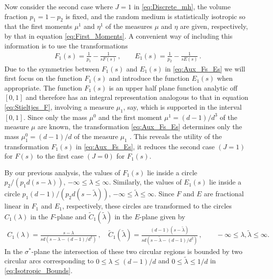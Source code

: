 \documentclass[11pt]{amsart}
\begin{document}
Now consider the second case where $J=1$ in \eqref{eq:Discrete_mh},
the volume fraction $p_1=1-p_2$ is fixed, and the random medium is
statistically isotropic so that the first moments $\mu^1$ and $\eta^1$ of
the measures $\mu$ and $\eta$ are given, respectively, by that in equation  
\eqref{eq:First_Moments}.  A convenient way of including this
information is to use the transformations \cite{Bergman:AP-78}
%
\begin{align}\label{eq:Aux_Fs_Es}
  F_1(s)=\frac{1}{p_1}-\frac{1}{sF(s)}\,, \qquad
  E_1(s)=\frac{1}{p_2}-\frac{1}{sE(s)}\,.
\end{align}
%
Due to the symmetries between $F_1(s)$ and $E_1(s)$ in
\eqref{eq:Aux_Fs_Es} we will first focus on the function $F_1(s)$ and
introduce the function $E_1(s)$ when appropriate. The function
$F_1(s)$ is an upper half plane function analytic off $[0,1]$ and
therefore has an integral representation
\cite{Bergman:AP-78,Golden:1986:BCP} analogous to that in equation
\eqref{eq:Stieltjes_F}, involving a
measure $\mu_1$, say, which is supported in the interval $[0,1]$. Since
only the mass $\mu^0$ and the first moment $\mu^1=(d-1)/d^3$ of the
measure $\mu$ are known, the transformation \eqref{eq:Aux_Fs_Es}
determines only the mass $\mu_1^0=(d-1)/d$ of the measure $\mu_1$
\cite{Bergman:AP-78,Golden:1986:BCP}. This reveals the utility of the
transformation $F_1(s)$ in \eqref{eq:Aux_Fs_Es}, it reduces the second
case $(J=1)$ for $F(s)$ to the first case $(J=0)$ for $F_1(s)$.



By our previous analysis, the values of $F_1(s)$ lie inside a circle
$p_2/(p_1d(s-\lambda))$, $-\infty\leq\lambda\leq\infty$. Similarly, the values of $E_1(s)$ lie
inside a circle $p_1(d-1)/(p_2d(s-\tilde{\lambda}))$,
$-\infty\leq\tilde{\lambda}\leq\infty$. Since $F$ and $E$ are fractional linear in $F_1$ and
$E_1$, respectively, these circles are transformed to the circles
$C_1(\lambda)$ in the $F$-plane and $\tilde{C}_1(\tilde{\lambda})$ in the
$E$-plane given by \cite{Golden:1986:BCP}
%
\begin{align}\label{eq:Isotropic_Bounds}
  C_1(\lambda)=\frac{s-\lambda}{sd(s-\lambda-(d-1)/d^2)}\,, \quad  %
  \tilde{C}_1(\tilde{\lambda})=\frac{(d-1)(s-\tilde{\lambda})}{sd(s-\tilde{\lambda}-(d-1)/d^2)}\,,
   \qquad -\infty\leq\lambda,\tilde{\lambda}\leq\infty. %
\end{align}
%
In the $\sigma^*$-plane the intersection of these two circular regions is
bounded by two circular arcs \cite{Golden:1986:BCP} corresponding to
$0\leq\lambda\leq(d-1)/d$ and $0\leq\tilde{\lambda}\leq1/d$ in \eqref{eq:Isotropic_Bounds}.
\end{document}
